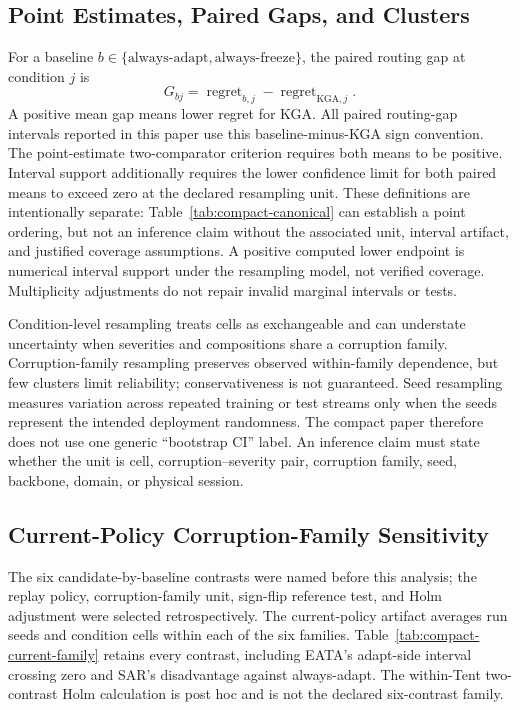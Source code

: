 \subsection{Point Estimates, Paired Gaps, and Clusters}

For a baseline $b\in\{\text{always-adapt},\text{always-freeze}\}$, the paired routing gap at
condition $j$ is
\[
G_{bj}=\operatorname{regret}_{b,j}-\operatorname{regret}_{\mathrm{KGA},j}.
\]
A positive mean gap means lower regret for KGA. All paired routing-gap intervals reported in this
paper use this baseline-minus-KGA sign convention. The point-estimate two-comparator criterion requires both
means to be positive. Interval support additionally requires the lower confidence limit for both
paired means to exceed zero at the declared resampling unit. These definitions are intentionally separate:
Table~\ref{tab:compact-canonical} can establish a point ordering, but not an inference claim without
the associated unit, interval artifact, and justified coverage assumptions. A positive computed
lower endpoint is numerical interval support under the resampling model, not verified coverage.
Multiplicity adjustments do not repair invalid marginal intervals or tests.

Condition-level resampling treats cells as exchangeable and can understate uncertainty when
severities and compositions share a corruption family. Corruption-family resampling preserves
observed within-family dependence, but few clusters limit reliability; conservativeness is not
guaranteed. Seed resampling measures variation across repeated training or test streams only when
the seeds represent the intended deployment randomness. The compact paper therefore does not use
one generic ``bootstrap CI'' label. An inference claim must state whether the unit is cell,
corruption--severity pair, corruption family, seed, backbone, domain, or physical session.

\subsection{Current-Policy Corruption-Family Sensitivity}

The six candidate-by-baseline contrasts were named before this analysis; the replay policy,
corruption-family unit, sign-flip reference test, and Holm adjustment were selected retrospectively.
The current-policy artifact averages run seeds and condition cells within each of the six families.
Table~\ref{tab:compact-current-family} retains every contrast, including EATA's adapt-side interval
crossing zero and SAR's disadvantage against always-adapt. The within-Tent two-contrast Holm
calculation is post hoc and is not the declared six-contrast family.

